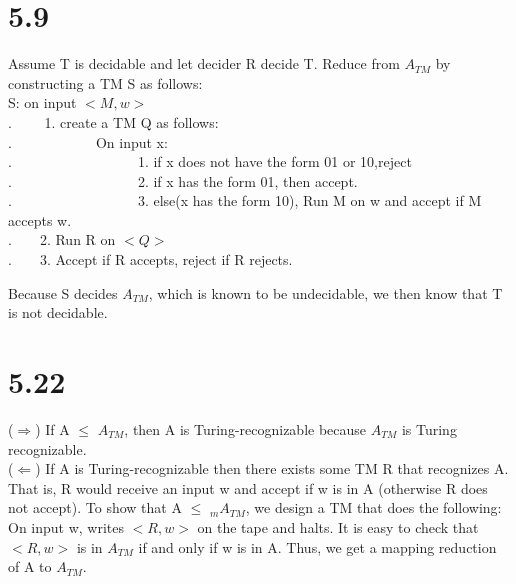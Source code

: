 \documentclass{scrartcl}
\begin{document}
\section*{5.9}
Assume T is decidable and let decider R decide T. Reduce from $A_{TM}$ by constructing a
TM S as follows: \\
S: on input $<M,w>$\\
$.   \qquad  $ 1. create a TM Q as follows:\\
$.   \qquad \qquad \qquad$On input x:\\
$.   \qquad \qquad \qquad \qquad \quad $1. if x does not have the form 01 or 10,reject\\
$.   \qquad \qquad \qquad \qquad \quad $2. if x has the form 01, then accept.\\
$.   \qquad \qquad \qquad \qquad \quad $3. else(x has the form 10), Run M on w and accept if M accepts w.\\
$.   \qquad  $2. Run R on $<Q>$\\
$.   \qquad  $3. Accept if R accepts, reject if R rejects.

Because S decides $A_{TM}$, which is known to be undecidable, we then know that T is not
decidable. 

\section*{5.22}
($\Rightarrow$) If A $\leq$ $A_{TM}$, then A is Turing-recognizable because $A_{TM}$ is Turing recognizable.\\
($\Leftarrow$) If A is Turing-recognizable then there exists some TM R that recognizes A. That is, R would receive an input w and accept if w is in A (otherwise R does not accept). To show that A $\leq$ $_m A_{TM}$, we design a TM that does the following: On input w, writes $<R,w>$ on the tape and halts. It is easy to check that $<R,w>$ is in $A_{TM}$ if and only if w is in A. Thus, we get a mapping reduction of A to $A_{TM}$. 
\end{document}
